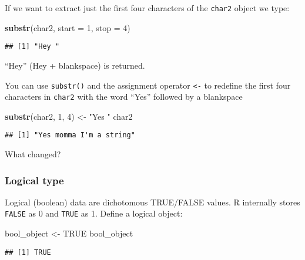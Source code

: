 \documentclass[]{article}
\newenvironment{Shaded}{\begin{snugshade}}{\end{snugshade}}
\newcommand{\KeywordTok}[1]{\textcolor[rgb]{0.13,0.29,0.53}{\textbf{#1}}}
\newcommand{\DataTypeTok}[1]{\textcolor[rgb]{0.13,0.29,0.53}{#1}}
\newcommand{\DecValTok}[1]{\textcolor[rgb]{0.00,0.00,0.81}{#1}}
\newcommand{\StringTok}[1]{\textcolor[rgb]{0.31,0.60,0.02}{#1}}
\newcommand{\OtherTok}[1]{\textcolor[rgb]{0.56,0.35,0.01}{#1}}
\newcommand{\NormalTok}[1]{#1}
\begin{document}
If we want to extract just the first four characters of the
\texttt{char2} object we type:

\begin{Shaded}
\begin{Highlighting}[]
\KeywordTok{substr}\NormalTok{(char2, }\DataTypeTok{start =} \DecValTok{1}\NormalTok{, }\DataTypeTok{stop =} \DecValTok{4}\NormalTok{)}
\end{Highlighting}
\end{Shaded}

\begin{verbatim}
## [1] "Hey "
\end{verbatim}

``Hey'' (Hey + blankspace) is returned.

You can use \texttt{substr()} and the assignment operator
\texttt{\textless{}-} to redefine the first four characters in
\texttt{char2} with the word ``Yes'' followed by a blankspace

\begin{Shaded}
\begin{Highlighting}[]
\KeywordTok{substr}\NormalTok{(char2, }\DecValTok{1}\NormalTok{, }\DecValTok{4}\NormalTok{) <-}\StringTok{ "Yes "}
\NormalTok{char2 }
\end{Highlighting}
\end{Shaded}

\begin{verbatim}
## [1] "Yes momma I'm a string"
\end{verbatim}

What changed?

\subsubsection{Logical type}\label{logical-type}

Logical (boolean) data are dichotomous TRUE/FALSE values. R internally
stores \texttt{FALSE} as 0 and \texttt{TRUE} as 1. Define a logical
object:

\begin{Shaded}
\begin{Highlighting}[]
\NormalTok{bool_object <-}\StringTok{ }\OtherTok{TRUE}
\NormalTok{bool_object}
\end{Highlighting}
\end{Shaded}

\begin{verbatim}
## [1] TRUE
\end{verbatim}
\end{document}
